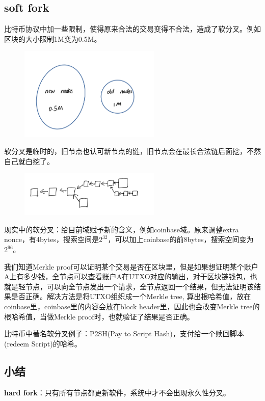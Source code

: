 \documentclass[10pt]{ctexart}
\begin{document}
\subsection{soft fork}
比特币协议中加一些限制，使得原来合法的交易变得不合法，造成了软分叉。例如区块的大小限制1M变为0.5M。
\begin{figure}[H]
    \centering
    \includegraphics[width=0.6\textwidth]{./lecture10/img3.png} 
\end{figure}
软分叉是临时的，旧节点也认可新节点的链，旧节点会在最长合法链后面挖，不然自己就白挖了。
\begin{figure}[H]
    \centering
    \includegraphics[width=0.6\textwidth]{./lecture10/img4.png} 
\end{figure}
现实中的软分叉：给目前域赋予新的含义，例如coinbase域。原来调整extra nonce，有4bytes，搜索空间是$2^{32}$，可以加上coinbase的前8bytes，搜索空间变为$2^{96}$。

我们知道Merkle proof可以证明某个交易是否在区块里，但是如果想证明某个账户A上有多少钱，全节点可以查看账户A在UTXO对应的输出，对于区块链钱包，也就是轻节点，可以向全节点发出一个请求，全节点返回一个结果，但无法证明该结果是否正确。解决方法是将UTXO组织成一个Merkle tree, 算出根哈希值，放在coinbase里，coinbase里的内容会放在block header里，因此也会改变Merkle tree的根哈希值，当做Merkle proof时，也就验证了结果是否正确。

比特币中著名软分叉例子：P2SH(Pay to Script Hash)，支付给一个赎回脚本(redeem Script)的哈希。
\subsection{小结}
\textbf{hard fork}：只有所有节点都更新软件，系统中才不会出现永久性分叉。
\end{document}
